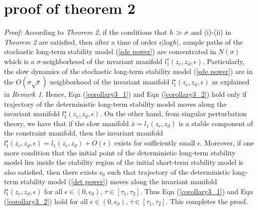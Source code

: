 \documentclass[journal]{IEEEtran}
\newcommand{\ee}{\epsilon}
\begin{document}
\section{proof of theorem 2}\label{appendix3}
\textit{Proof:} According to \textit{Theorem 2}, if the conditions that $h\gg\sigma$ and (i)-(ii) in \textit{Theorem 2} are satisfied, then after a time of order $\ee|\mbox{log}h|$, sample paths of the stochastic long-term stability model (\ref{sde power}) are concentrated in $N(\sigma)$ which is a $\sigma$-neighborhood of the invariant manifold $l_1^\star(z_c,z_d,\ee)$. Particularly, the slow dynamics of the stochastic long-term stability model (\ref{sde power}) are in the $O(\sigma\sqrt{\ee})$ neighborhood of the invariant manifold $l_1^\star(z_c,z_d,\ee)$ as explained in \textit{Remark 1}.
Hence, Eqn (\ref{corollary3_1}) and Eqn (\ref{corollary3_2}) hold only if trajectory of the deterministic long-term stability model moves along the invariant manifold $l_1^\star(z_c,z_d,\ee)$. On the other hand, from singular perturbation theory, we have that if the slow manifold $\bar{x}=l_1(z_c,z_d)$ is a stable component of the constraint manifold, then the invariant manifold $l_1^\star(z_c,z_d,\ee)=l_1(z_c,z_d)+O(\ee)$ exists for sufficiently small $\ee$. Moreover, if one more condition that the initial point of the deterministic long-term stability model lies inside the stability region of the initial short-term stability model is also satisfied,  then there exists $\ee_0$ such that trajectory of the deterministic long-term stability model (\ref{det power}) moves along the invariant manifold $l_1^\star(z_c,z_d,\ee)$ for all $\ee\in(0,\ee_0)$,  $\tau\in[\tau_1,\tau_2]$\cite{Khalil:book}\cite{Wangxz:CAS}. Thus Eqn (\ref{corollary3_1}) and Eqn (\ref{corollary3_2}) hold for all $\ee\in(0,\ee_0)$, $\tau\in[\tau_1,\tau_2]$. This completes the proof.



\ifCLASSOPTIONcaptionsoff
  \newpage
\fi
\end{document}
